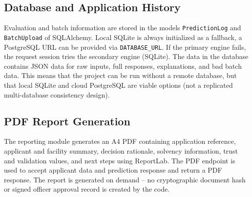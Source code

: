 \clearpage
\begingroup
\setlength{\intextsep}{5pt}
\setlength{\textfloatsep}{8pt}
\setlength{\floatsep}{8pt}
\renewcommand{\topfraction}{1.0}
\renewcommand{\bottomfraction}{1.0}
\renewcommand{\textfraction}{0.0}

\clearpage


\clearpage


\clearpage
\endgroup

\subsection{Database and Application History}
Evaluation and batch information are stored in the models \texttt{PredictionLog} and \texttt{BatchUpload} of SQLAlchemy. Local SQLite is always initialized as a fallback, a PostgreSQL URL can be provided via \texttt{DATABASE\_URL}. If the primary engine fails, the request session tries the secondary engine (SQLite). The data in the database contains JSON data for raw inputs, full responses, explanations, and bad batch data. This means that the project can be run without a remote database, but that local SQLite and cloud PostgreSQL are viable options (not a replicated multi-database consistency design).

\subsection{PDF Report Generation}
The reporting module generates an A4 PDF containing application reference, applicant and facility summary, decision rationale, solvency information, trust and validation values, and next steps using ReportLab. The PDF endpoint is used to accept applicant data and prediction response and return a PDF response. The report is generated on demand -- no cryptographic document hash or signed officer approval record is created by the code.

